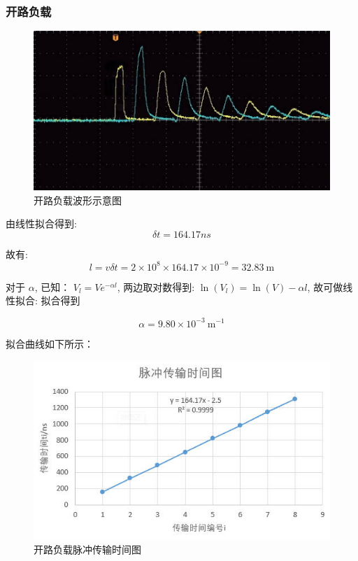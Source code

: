 \documentclass[UTF8]{ctexart}
\begin{document}
\subsubsection{开路负载}
\begin{figure}[H]
  \centering
  \includegraphics[scale=0.22]{1.jpg}
  \caption{开路负载波形示意图}
  \label{fig:my_label}
\end{figure}

由线性拟合得到:
$$
\delta t=164.17 n s
$$

故有:
$$
l=v \delta t=2 \times 10^{8} \times 164.17 \times 10^{-9}=32.83\mathrm{~m}
$$

对于 $\alpha$, 已知： $V_{l}=V e^{-\alpha l}$, 两边取对数得到: $\ln \left(V_{l}\right)=\ln (V)-\alpha l$, 故可做线性拟合: 拟合得到

$$
\alpha=9.80 \times 10^{-3} \mathrm{~m}^{-1}
$$

拟合曲线如下所示：

\begin{figure}[H]
  \centering
  \includegraphics[scale=0.4]{图表1.jpg}
  \caption{开路负载脉冲传输时间图}
  \label{fig:my_label}
\end{figure}
\end{document}
